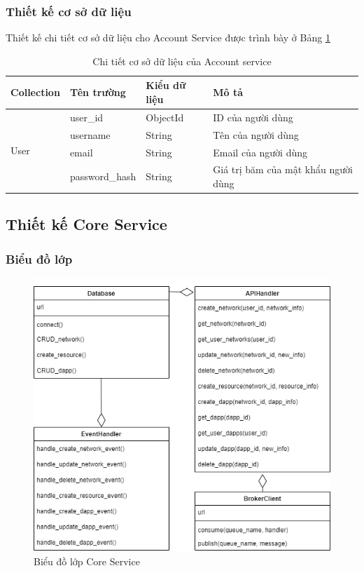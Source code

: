\documentclass[../DoAn.tex]{subfiles}
\begin{document}
\subsubsection{Thiết kế cơ sở dữ liệu}

Thiết kế chi tiết cơ sở dữ liệu cho Account Service được trình bày ở Bảng
\ref{tab:dbAccountService}

\begin{longtable}{|p{}|p{}|p{}|p{}|}
    \caption{Chi tiết cơ sở dữ liệu của Account service}
    \label{tab:dbAccountService}                                                                                 \\
    \hline
    Collection                             & Tên trường     & Kiểu dữ liệu & Mô tả                               \\ \hline
    \multirow[t]{4}{0.175\textwidth}{User} & user\_id       & ObjectId     & ID của người dùng                   \\ \cline{2-4}
                                           & username       & String       & Tên của người dùng                  \\ \cline{2-4}
                                           & email          & String       & Email của người dùng                \\ \cline{2-4}
                                           & password\_hash & String       & Giá trị băm của mật khẩu người dùng \\ \hline
\end{longtable}

\subsection{Thiết kế Core Service}

\subsubsection{Biểu đồ lớp}

\begin{figure}[H]
    \centering
    \includegraphics[width=0.75\linewidth]{Hinhve/DoAn-ClassCoreService.drawio.png}
    \caption{Biểu đồ lớp Core Service}
    \label{fig:classCoreService}
\end{figure}
\end{document}
